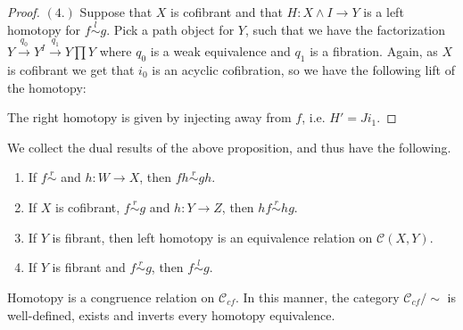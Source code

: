 \documentclass[../thesis.tex]{subfiles}
\begin{document}
\begin{proof}
                $(4.)$ Suppose that $X$ is cofibrant and that $H:X\wedge I\rightarrow Y$ is a left homotopy for $f \overset{l}{\sim} g$. Pick a path object for $Y$, such that we have the factorization $Y\overset{q_0}{\rightarrow}Y^I\overset{q_1}{\rightarrow}Y\prod Y$ where $q_0$ is a weak equivalence and $q_1$ is a fibration. Again, as $X$ is cofibrant we get that $i_0$ is an acyclic cofibration, so we have the following lift of the homotopy:
                \begin{center}
                \end{center}
                The right homotopy is given by injecting away from $f$, i.e. $H' = Ji_1$.
            \end{proof}

            \begin{corollary}
                We collect the dual results of the above proposition, and thus have the following.
                \begin{enumerate}
                    \item If $f \overset{r}{\sim}$ and $h: W \rightarrow X$, then $fh \overset{r}{\sim} gh$.
                    \item If $X$ is cofibrant, $f \overset{r}{\sim} g$ and $h: Y \rightarrow Z$, then $hf \overset{r}{\sim} hg$.
                    \item If $Y$ is fibrant, then left homotopy is an equivalence relation on $\mathcal{C}(X,Y)$.
                    \item If $Y$ is fibrant and $f \overset{r}{\sim} g$, then $f \overset{l}{\sim} g$.
                \end{enumerate}
            \end{corollary}

            \begin{corollary}
                Homotopy is a congruence relation on $\mathcal{C}_{cf}$. In this manner, the category $\mathcal{C}_{cf}/\sim$ is well-defined, exists and inverts every homotopy equivalence.
            \end{corollary}
\end{document}
